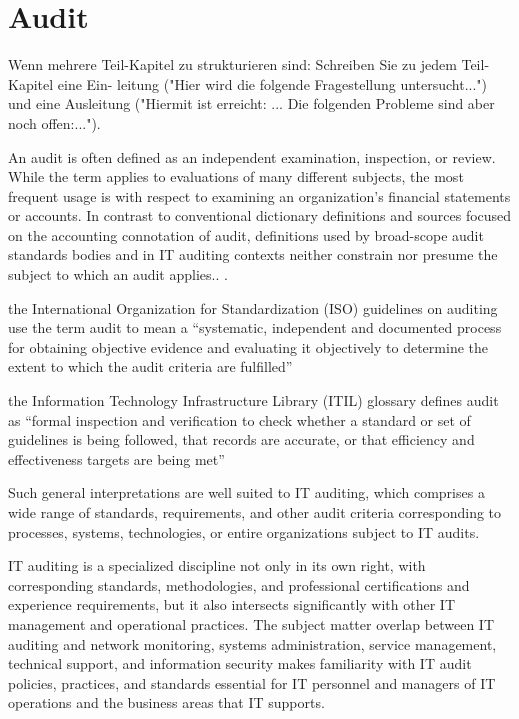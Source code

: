 %
\chapter{Audit}\label{chap:adt}

Wenn mehrere Teil-Kapitel zu strukturieren sind: Schreiben Sie zu jedem Teil-Kapitel eine Ein- leitung ("Hier wird die folgende Fragestellung untersucht...") und eine Ausleitung ("Hiermit ist erreicht: ... Die folgenden Probleme sind aber noch offen:...").

An audit is often defined as an independent examination, inspection, or review.
While the term applies to evaluations of many different subjects, the most frequent usage is with respect to examining an organization’s financial statements or accounts. In contrast to conventional dictionary definitions and sources focused on
the accounting connotation of audit, definitions used by broad-scope audit standards bodies and in IT auditing contexts neither constrain nor presume the subject to which an audit applies.. \citep{GANTZ20141}.

the International Organization for
Standardization (ISO) guidelines on auditing use the term audit to mean a “systematic, independent and documented process for obtaining objective evidence and evaluating it objectively to determine the extent to which the audit criteria are fulfilled” \citep{ISOISO1953}

the Information Technology Infrastructure Library (ITIL) glossary
defines audit as “formal inspection and verification to check whether a standard or set of guidelines is being followed, that records are accurate, or that efficiency and
effectiveness targets are being met”~\citep{hanna2011itil}

Such general interpretations are well suited to IT auditing, which comprises a wide range of standards, requirements, and other audit criteria corresponding to processes, systems, technologies, or entire organizations subject to IT audits.

IT auditing is a specialized discipline not only in its own right, with
corresponding standards, methodologies, and professional certifications and experience requirements, but it also intersects significantly with other IT management and
operational practices. The subject matter overlap between IT auditing and network
monitoring, systems administration, service management, technical support, and
information security makes familiarity with IT audit policies, practices, and standards essential for IT personnel and managers of IT operations and the business areas
that IT supports.

